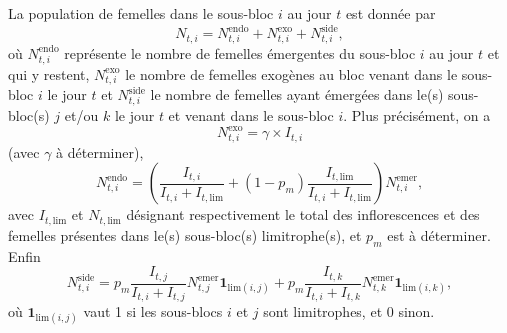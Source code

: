\documentclass[a4paper, 11pt]{article}
\begin{document}
La population de femelles dans le sous-bloc $i$ au jour $t$ est donnée par
$$
N_{t, i} = N^{\text{endo}}_{t, i} + N^{\text{exo}}_{t, i}  + N^{\text{side}}_{t, i},
$$
où $N^{\text{endo}}_{t, i}$ représente le nombre de femelles émergentes du sous-bloc $i$ au jour $t$ et qui y restent, $N^{\text{exo}}_{t, i}$ le nombre de femelles exogènes au bloc venant dans le sous-bloc $i$ le jour $t$ et $N^{\text{side}}_{t, i}$ le nombre de femelles ayant émergées dans le(s) sous-bloc(s) $j$ et/ou $k$ le jour $t$ et venant dans le sous-bloc $i$.
Plus précisément, on a 
$$
N^{\text{exo}}_{t, i} = \gamma \times I_{t, i}
$$
(avec $\gamma$ à déterminer),
$$
 N^{\text{endo}}_{t, i} = \left(\frac{I_{t, i}}{I_{t, i} + I_{t, \text{lim}}} + \left( 1-p_m \right)\frac{I_{t, \text{lim}}}{I_{t, i} + I_{t, \text{lim}}}\right) N^{\text{emer}}_{t, i}, 
$$
avec $I_{t, \text{lim}}$ et $N_{t, \text{lim}}$ désignant respectivement le total des inflorescences et des femelles présentes dans le(s) sous-bloc(s) limitrophe(s), et  $p_m$ est à déterminer. Enfin
$$
N^{\text{side}}_{t, i} = p_m \frac{I_{t, j}}{I_{t, i} + I_{t, j}} N^{\text{emer}}_{t, j} \mathbf{1}_{\text{lim}(i, j)} +p_m \frac{I_{t, k}}{I_{t, i} + I_{t, k}} N^{\text{emer}}_{t, k} \mathbf{1}_{\text{lim}(i, k)},
$$
où $\mathbf{1}_{\text{lim}(i, j)}$ vaut 1 si les sous-blocs $i$ et $j$ sont limitrophes, et 0 sinon.
\end{document}

